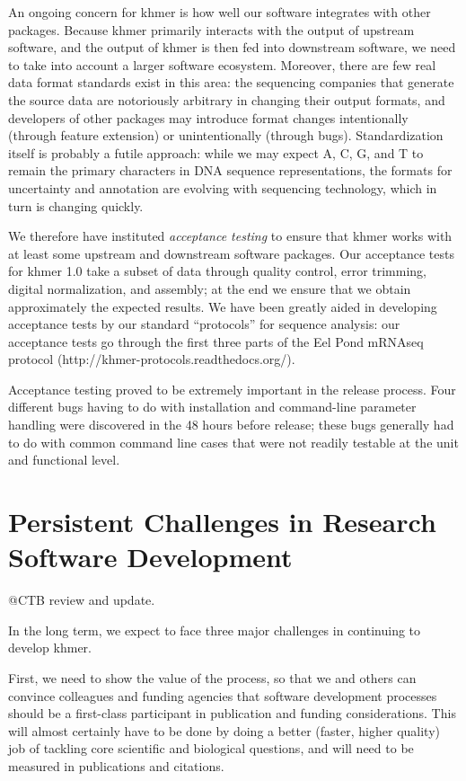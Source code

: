 \documentclass[11pt]{article}
\begin{document}
An ongoing concern for khmer is how well our software integrates with
other packages.  Because khmer primarily interacts with the output of
upstream software, and the output of khmer is then fed into downstream
software, we need to take into account a larger software ecosystem.
Moreover, there are few real data format standards exist in this area:
the sequencing companies that generate the source data are notoriously
arbitrary in changing their output formats, and developers of other
packages may introduce format changes intentionally (through feature
extension) or unintentionally (through bugs).  Standardization itself
is probably a futile approach: while we may expect A, C, G, and T to
remain the primary characters in DNA sequence representations, the
formats for uncertainty and annotation are evolving with sequencing
technology, which in turn is changing quickly.

We therefore have instituted {\em acceptance testing} to ensure that
khmer works with at least some upstream and downstream software
packages.  Our acceptance tests for khmer 1.0 take a subset of data
through quality control, error trimming, digital normalization, and
assembly; at the end we ensure that we obtain approximately the
expected results.  We have been greatly aided in developing acceptance
tests by our standard ``protocols'' for sequence analysis: our
acceptance tests go through the first three parts of the Eel Pond
mRNAseq protocol (http://khmer-protocols.readthedocs.org/).

Acceptance testing proved to be extremely important in the release
process.  Four different bugs having to do with installation and
command-line parameter handling were discovered in the 48 hours before
release; these bugs generally had to do with common command line cases
that were not readily testable at the unit and functional level.

\section{Persistent Challenges in Research Software Development}

@CTB review and update.

In the long term, we expect to face three major challenges in continuing
to develop khmer.

First, we need to show the value of the process, so that we and others
can convince colleagues and funding agencies that software development
processes should be a first-class participant in publication and
funding considerations.  This will almost certainly have to be done
by doing a better (faster, higher quality) job of tackling core
scientific and biological questions, and will need to be measured
in publications and citations.
\end{document}
